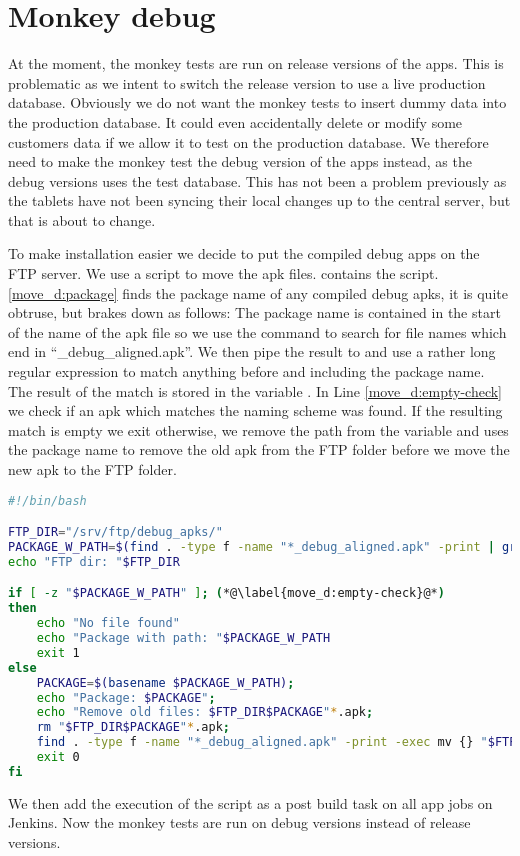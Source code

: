 \chapter{Monkey debug}

At the moment, the monkey tests are run on release versions of the apps. This is problematic as we intent to switch the release version to use a live production database. Obviously we do not want the monkey tests to insert dummy data into the production database. It could even accidentally delete or modify some customers data if we allow it to test on the production database. We therefore need to make the monkey test the debug version of the apps instead, as the debug versions uses the test database. This has not been a problem previously as the tablets have not been syncing their local changes up to the central server, but that is about to change.

To make installation easier we decide to put the compiled debug apps on the FTP server. We use a  script to move the apk files.  contains the script. \ref{move_d:package} finds the package name of any compiled debug apks, it is quite obtruse, but brakes down as follows: The package name is contained in the start of the name of the apk file so we use the  command to search for file names which end in ``\_debug\_aligned.apk''. We then pipe the result to  and use a rather long regular expression to match anything before and including the package name. The result of the match is stored in the variable . In Line \ref{move_d:empty-check} we check if an apk which matches the naming scheme was found. If the resulting match is empty we exit otherwise, we remove the path from the variable  and uses the package name to remove the old apk from the FTP folder before we move the new apk to the FTP folder.
\begin{lstlisting}[language=bash,showstringspaces=false,caption=Script that moves the debug apk to the ftp server,label=lst:move_debug_apk]
#!/bin/bash

FTP_DIR="/srv/ftp/debug_apks/"
PACKAGE_W_PATH=$(find . -type f -name "*_debug_aligned.apk" -print | grep ".+(?=_v[0-9]+\.[0-9]+b[0-9]+_debug_aligned\.apk)" -Po) (*@\label{move_d:package}@*)
echo "FTP dir: "$FTP_DIR

if [ -z "$PACKAGE_W_PATH" ]; (*@\label{move_d:empty-check}@*)
then
    echo "No file found"
    echo "Package with path: "$PACKAGE_W_PATH
    exit 1
else
    PACKAGE=$(basename $PACKAGE_W_PATH);
    echo "Package: $PACKAGE";
    echo "Remove old files: $FTP_DIR$PACKAGE"*.apk;
    rm "$FTP_DIR$PACKAGE"*.apk;
    find . -type f -name "*_debug_aligned.apk" -print -exec mv {} "$FTP_DIR" \;
    exit 0
fi


\end{lstlisting}
We then add the execution of the script as a post build task on all app jobs on Jenkins. 
Now the monkey tests are run on debug versions instead of release versions.